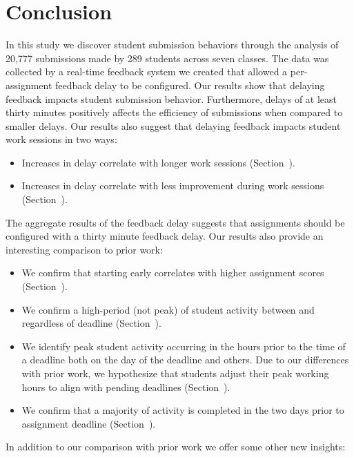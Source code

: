 \section{Conclusion} 
In this study we discover student submission behaviors through the analysis of
20,777 submissions made by 289 students across seven classes. The data was
collected by a real-time feedback system we created that allowed a
per-assignment feedback delay to be configured. Our results show that delaying
feedback impacts student submission behavior. Furthermore, delays of at least
thirty minutes positively affects the efficiency of submissions when compared
to smaller delays. Our results also suggest that delaying feedback impacts
student work sessions in two ways:

\begin{itemize}
\item Increases in delay correlate with longer work sessions
  (Section~).
\item Increases in delay correlate with less improvement during work sessions
  (Section~).
\end{itemize}

The aggregate results of the feedback delay suggests that assignments should be
configured with a thirty minute feedback delay. Our results also provide an
interesting comparison to prior work:

\begin{itemize}
\item We confirm that starting early correlates with higher assignment
  scores (Section~).
\item We confirm a high-period (not peak) of student activity between 
  and  regardless of deadline (Section~).
\item We identify peak student activity occurring in the hours prior to the
  time of a deadline both on the day of the deadline and others. Due to our
  differences with prior work, we hypothesize that students adjust their peak
  working hours to align with pending deadlines (Section~).
\item We confirm that a majority of activity is completed in the two days prior
  to assignment deadline (Section~).
\end{itemize}

In addition to our comparison with prior work we offer some other new insights:

